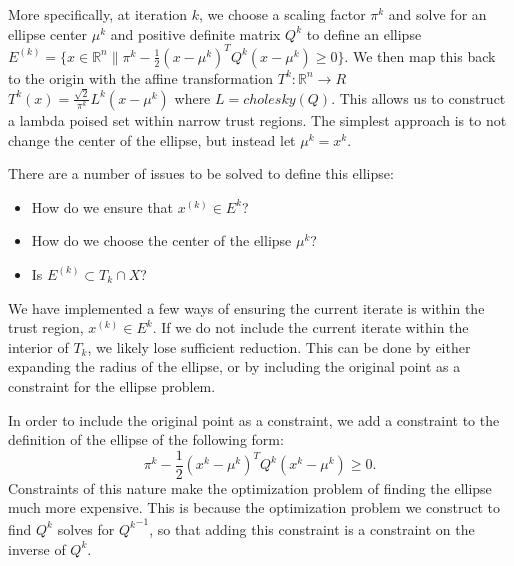 \documentclass{article}
\theoremstyle{case}
\newcommand{\domain}{X}
\newcommand{\ellipsek}{{E^{(k)}}}
\begin{document}
More specifically, at iteration $k$, we choose a scaling factor $\pi^k$ and solve for an ellipse center $\mu^k$ and positive definite matrix $Q^k$ to define an ellipse
$ \ellipsek = \{x \in \mathbb R^n \| \pi^k - \frac 1 2 (x - \mu^{k})^TQ^{k}(x - \mu^{k}) \ge 0 \}$.
We then map this back to the origin with the affine transformation $T^k : \mathbb R^n \to R$ $T^k(x) = \frac {\sqrt{2}}{\pi^k} L^k(x-\mu^k)$ where $L = cholesky(Q)$.
This allows us to construct a lambda poised set within narrow trust regions.
The simplest approach is to not change the center of the ellipse, but instead let $\mu^k = x^k$.

There are a number of issues to be solved to define this ellipse:
\begin{itemize}
\item How do we ensure that $x^{(k)} \in E^k$?
\item How do we choose the center of the ellipse $\mu^k$?
\item Is $ \ellipsek \subset T_k \cap \domain$?
\end{itemize}

We have implemented a few ways of ensuring the current iterate is within the trust region, $x^{(k)} \in E^k$.
If we do not include the current iterate within the interior of $T_{k}$, we likely lose sufficient reduction.
This can be done by either expanding the radius of the ellipse, or by including the original point as a constraint for the ellipse problem.


In order to include the original point as a constraint, we add a constraint to the definition of the ellipse of the following form:
$$ \pi^k - \frac 1 2 (x^k - \mu^{k})^TQ^{k}(x^k - \mu^{k}) \ge 0. $$
Constraints of this nature make the optimization problem of finding the ellipse much more expensive.
This is because the optimization problem we construct to find $Q^k$ solves for ${Q^k}^{-1}$, so that adding this constraint is a constraint on the inverse of $Q^k$.


\end{document}
